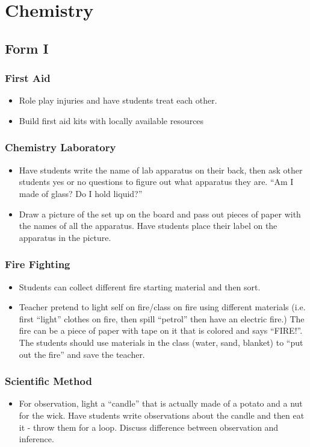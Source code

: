 \section{Chemistry}
\subsection{Form I}
\subsubsection{First Aid}
\begin{itemize}
\item	Role play injuries and have students treat each other.
\item	Build first aid kits with locally available resources
\end{itemize}

\subsubsection{Chemistry Laboratory}
\begin{itemize}
\item	Have students write the name of lab apparatus on their back, then ask other students yes or no questions to figure out what apparatus they are. ``Am I made of glass? Do I hold liquid?''
\item Draw a picture of the set up on the board and pass out pieces of paper with the names of all the apparatus. Have students place their label on the apparatus in the picture. 
\end{itemize}

\subsubsection{Fire Fighting}
\begin{itemize}
\item	Students can collect different fire starting material and then sort.
\item Teacher pretend to light self on fire/class on fire using different materials (i.e. first ``light'' clothes on fire, then spill ``petrol'' then have an electric fire.) The fire can be a piece of paper with tape on it that is colored and says ``FIRE!''. The students should use materials in the class (water, sand, blanket) to ``put out the fire'' and save the teacher.
\end{itemize}

\subsubsection{Scientific Method}
\begin{itemize}
\item	For observation, light a ``candle'' that is actually made of a potato and a nut for the wick. Have students write observations about the candle and then eat it - throw them for a loop. Discuss difference between observation and inference.
\end{itemize}

